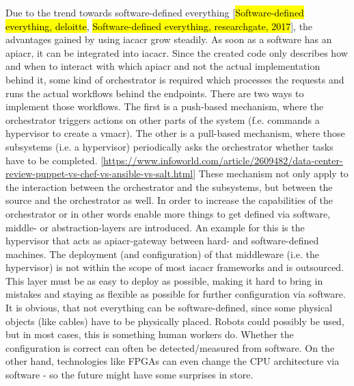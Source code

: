 \newline
Due to the trend towards software-defined everything [\hl{Software-defined everything, deloitte}, \hl{Software-defined everything, researchgate, 2017}], the advantages gained by using \gls{iacacr} grow steadily. As soon as a software has an \gls{apiacr}, it can be integrated into \gls{iacacr}. Since the created code only describes how and when to interact with which \gls{apiacr} and not the actual implementation behind it, some kind of orchestrator is required which processes the requests and runs the actual workflows behind the endpoints.
\newline
There are two ways to implement those workflows. The first is a push-based mechanism, where the orchestrator triggers actions on other parts of the system (f.e. commands a hypervisor to create a \gls{vmacr}). The other is a pull-based mechanism, where those subsystems (i.e. a hypervisor) periodically asks the orchestrator whether tasks have to be completed. [\url{https://www.infoworld.com/article/2609482/data-center-review-puppet-vs-chef-vs-ansible-vs-salt.html}]
\newline
These mechanism not only apply to the interaction between the orchestrator and the subsystems, but between the source and the orchestrator as well.
\newline
In order to increase the capabilities of the orchestrator or in other words enable more things to get defined via software, middle- or abstraction-layers are introduced. An example for this is the hypervisor that acts as \gls{apiacr}-gateway between hard- and software-defined machines. The deployment (and configuration) of that middleware (i.e. the hypervisor) is not within the scope of most \gls{iacacr} frameworks and is outsourced. This layer must be as easy to deploy as possible, making it hard to bring in mistakes and staying as flexible as possible for further configuration via software.
\newline
It is obvious, that not everything can be software-defined, since some physical objects (like cables) have to be physically placed. Robots could possibly be used, but in most cases, this is something human workers do. Whether the configuration is correct can often be detected/measured from software. On the other hand, technologies like FPGAs can even change the CPU architecture via software - so the future might have some surprises in store.




